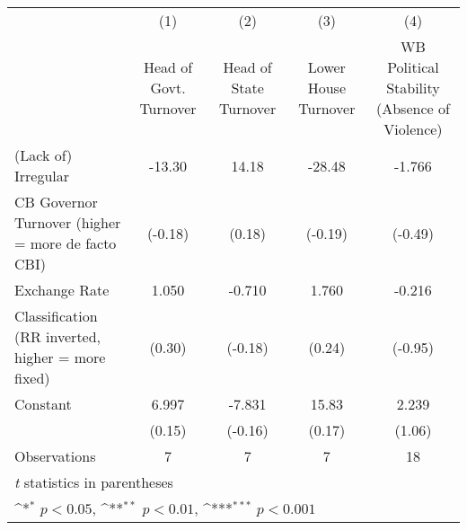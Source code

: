 {
\def\sym#1{\ifmmode^{#1}\else\(^{#1}\)\fi}
\begin{tabular}{l*{4}{c}}
\hline\hline
                    &\multicolumn{1}{c}{(1)}&\multicolumn{1}{c}{(2)}&\multicolumn{1}{c}{(3)}&\multicolumn{1}{c}{(4)}\\
                    &\multicolumn{1}{c}{Head of Govt. Turnover}&\multicolumn{1}{c}{Head of State Turnover}&\multicolumn{1}{c}{Lower House Turnover}&\multicolumn{1}{c}{WB Political Stability (Absence of Violence)}\\
\hline
(Lack of) Irregular &      -13.30         &       14.18         &      -28.48         &      -1.766         \\
CB Governor Turnover (higher = more de facto CBI)&     (-0.18)         &      (0.18)         &     (-0.19)         &     (-0.49)         \\
[1em]
Exchange Rate       &       1.050         &      -0.710         &       1.760         &      -0.216         \\
Classification (RR inverted, higher = more fixed)&      (0.30)         &     (-0.18)         &      (0.24)         &     (-0.95)         \\
[1em]
Constant            &       6.997         &      -7.831         &       15.83         &       2.239         \\
                    &      (0.15)         &     (-0.16)         &      (0.17)         &      (1.06)         \\
\hline
Observations        &           7         &           7         &           7         &          18         \\
\hline\hline
\multicolumn{5}{l}{\footnotesize \textit{t} statistics in parentheses}\\
\multicolumn{5}{l}{\footnotesize \sym{*} \(p<0.05\), \sym{**} \(p<0.01\), \sym{***} \(p<0.001\)}\\
\end{tabular}
}
